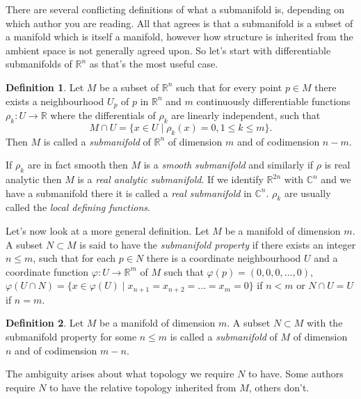 \documentclass[12pt]{article}
\theoremstyle{theorem}
\theoremstyle{definition}
\newtheorem*{defn}{Definition}
\theoremstyle{remark}
\begin{document}
There are several conflicting definitions of what a submanifold is, depending on which author you are reading.  All that agrees is that a submanifold is a subset of a manifold which is itself a manifold, however how structure is inherited from the ambient space is not generally agreed upon.
So let's start with differentiable submanifolds of ${\mathbb{R}}^n$ as that's the most useful case.

\begin{defn}
Let $M$ be a subset of ${\mathbb{R}}^n$ such that for every point
$p \in M$ there exists a neighbourhood $U_p$ of $p$ in ${\mathbb{R}}^n$
and $m$ continuously differentiable functions $\rho_k \colon U \to {\mathbb{R}}$ where the differentials of $\rho_k$ are linearly independent,
such that
\begin{equation*}
M \cap U = \{ x \in U \mid \rho_k(x) = 0 , 1 \leq k \leq m \} .
\end{equation*}
Then $M$ is called a {\em submanifold} of ${\mathbb{R}}^n$ of dimension $m$
and of codimension $n-m$.
\end{defn}

If $\rho_k$ are in fact smooth then $M$ is a {\em smooth submanifold} and
similarly if $\rho$ is real analytic then $M$ is a {\em real analytic
submanifold}. If
we identify ${\mathbb{R}}^{2n}$ with ${\mathbb{C}}^n$ and we have a
submanifold there it is called a {\em real submanifold} in
${\mathbb{C}}^n$.  $\rho_k$ are usually called the {\em local defining functions}.

Let's now look at a more general definition.  Let $M$ be a manifold of dimension $m$.  A subset $N \subset M$ is said to have the {\em submanifold property} if there exists an integer $n \leq m$, such that for
each
$p \in N$ there is a coordinate neighbourhood $U$ and a coordinate function $\varphi \colon U \to {\mathbb{R}}^m$ of $M$ such that $\varphi(p) = (0,0,0,\ldots,0)$,
$\varphi(U \cap N) = \{ x \in \varphi(U) \mid x_{n+1} = x_{n+2} = \ldots = x_m = 0 \}$ if $n < m$ or $N \cap U = U$ if $n=m$.

\begin{defn}
Let $M$ be a manifold of dimension $m$.
A subset $N \subset M$ with the submanifold property
for some $n \leq m$ is called a {\em submanifold} of $M$ of dimension $n$ and of codimension $m-n$.
\end{defn}

The ambiguity arises about what topology we require $N$ to have.  Some authors require $N$ to have the relative topology inherited from $M$, others don't.
\end{document}
